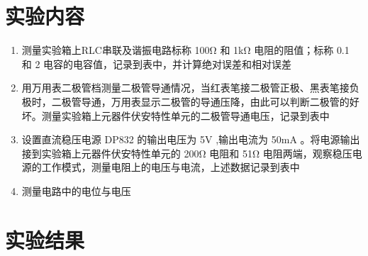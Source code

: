\documentclass[a4paper,utf8]{article}
\begin{document}
\section{实验内容}
    \begin{enumerate}
        \item 测量实验箱上RLC串联及谐振电路标称 100\unit{\ohm} 和 1\unit{\kilo\ohm} 电阻的阻值；标称 0.1\unit{\uF} 和 2\unit{\uF} 电容的电容值，记录到表中，并计算绝对误差和相对误差
        \item 用万用表二极管档测量二极管导通情况，当红表笔接二极管正极、黑表笔接负极时，二极管导通，万用表显示二极管的导通压降，由此可以判断二极管的好坏。测量实验箱上元器件伏安特性单元的二极管导通电压，记录到表中
        \item 设置直流稳压电源 DP832 的输出电压为 5\unit{\V} ,输出电流为 50\unit{\mA} 。将电源输出接到实验箱上元器件伏安特性单元的 200\unit{\ohm} 电阻和 51\unit{\ohm} 电阻两端，观察稳压电源的工作模式，测量电阻上的电压与电流，上述数据记录到表中
        \item 测量电路中的电位与电压
    \end{enumerate}

\section{实验结果}
\end{document}
